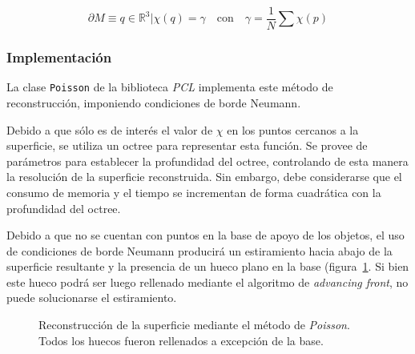 		\[\partial M \equiv {q \in \mathbb{R}^3 | \chi(q) = \gamma} \quad \mbox{con}
			\quad \gamma = \frac{1}{N} \sum \chi(p) \]




	\subsubsection{Implementación}
	La clase \texttt{Poisson} de la biblioteca \emph{PCL} implementa este método de reconstrucción,
	imponiendo condiciones de borde Neumann.

	Debido a que sólo es de interés el valor de $\chi$ en los puntos cercanos a
	la superficie, se utiliza un octree para representar esta función. Se
	provee de parámetros para establecer la profundidad del octree, controlando
	de esta manera la resolución de la superficie reconstruida.
	Sin embargo, debe considerarse que el consumo de memoria y el tiempo se incrementan de forma
	cuadrática con la profundidad del octree.

	Debido a que no se cuentan con puntos en la base de apoyo de los objetos, el uso de condiciones de borde Neumann
	producirá un estiramiento hacia abajo de la superficie resultante y la presencia de
	un hueco plano en la base (figura~\ref{fig:fill_poisson}.
	Si bien este hueco podrá ser luego rellenado mediante el algoritmo de \emph{advancing front}, no puede solucionarse el estiramiento.



	\begin{figure}
		 
		\caption{\label{fig:fill_poisson}Reconstrucción de la superficie mediante el método de \emph{Poisson}. Todos los huecos fueron rellenados a excepción de la base.}
	\end{figure}

